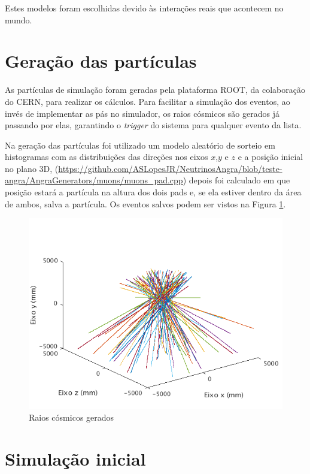Estes modelos foram escolhidas devido às interações reais que acontecem no mundo.


\section{Geração das partículas}

As partículas de simulação foram geradas pela plataforma ROOT, da colaboração do \ac{CERN}, para realizar os cálculos. Para facilitar a simulação dos eventos, ao invés de implementar as pás no simulador, os raios cósmicos são gerados já passando por elas, garantindo o \emph{trigger} do sistema para qualquer evento da lista. 

 Na geração das partículas foi utilizado um modelo aleatório de sorteio em histogramas com as distribuições das direções nos eixos $x$,$y$ e $z$ e a posição inicial no plano 3D, (\url{https://github.com/ASLopesJR/NeutrinosAngra/blob/teste-angra/AngraGenerators/muons/muons_pad.cpp}) depois foi calculado em que posição estará a partícula na altura dos dois pads e, se ela estiver dentro da área de ambos, salva a partícula. Os eventos salvos podem ser vistos na Figura \ref{fig:geracao}.

\begin{figure}[H]
	\centering
	\includegraphics[width=16cm]{textuais/simulacao/figuras/geracao.png}
	\caption{Raios cósmicos gerados}
	\label{fig:geracao}
\end{figure}


\section{Simulação inicial}

